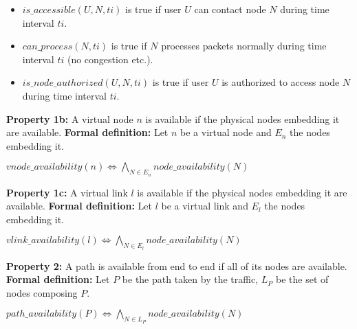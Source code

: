 \begin{itemize}
\item $is\_accessible(U,N,ti)$ is true if user $U$ can contact node $N$ during time interval $ti$.
\item $can\_process(N,ti)$ is true if $N$ processes packets normally during time interval $ti$ (\eg no congestion etc.).
\item $is\_node\_authorized(U,N,ti)$ is true if user $U$ is authorized to access node $N$ during time interval $ti$.
\end{itemize} 

\textbf{Property 1b:} A virtual node $n$ is available if the physical nodes embedding it are available.
\newline
\textbf{Formal definition:} Let $n$ be a virtual node and $E_n$ the nodes embedding it.

\begin{myformula}
$vnode\_availability(n) \Leftrightarrow \bigwedge\limits_{N \in E_n} node\_availability(N)$
\end{myformula}

\textbf{Property 1c:} A virtual link $l$ is available if the physical nodes embedding it are available.
\newline
\textbf{Formal definition:} Let $l$ be a virtual link and $E_l$ the nodes embedding it.

\begin{myformula}
$vlink\_availability(l) \Leftrightarrow \bigwedge\limits_{N \in E_l} node\_availability(N)$
\end{myformula}

\textbf{Property 2:} A path is available from end to end if all of its nodes are available.
\newline \textbf{Formal definition:} Let $P$ be the path taken by the traffic, $L_P$ be the set of nodes composing $P$. 

\begin{myformula}
$path\_availability(P)\Leftrightarrow\bigwedge\limits_{N \in L_P}node\_availability(N)$
\end{myformula}




